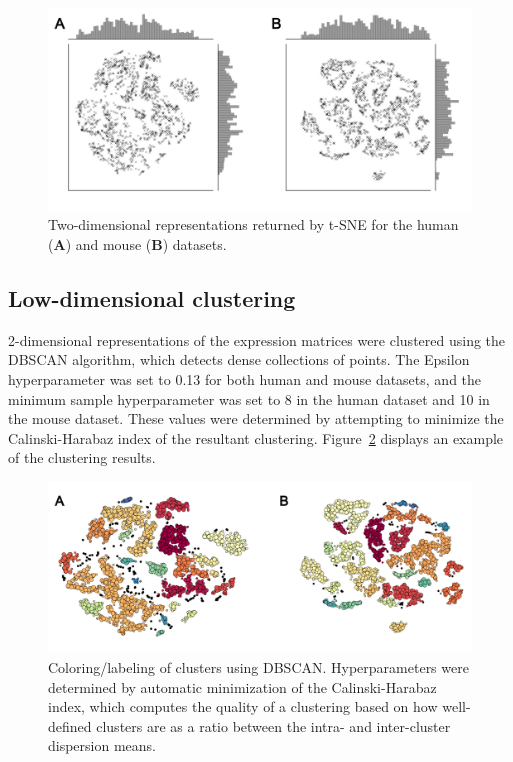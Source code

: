 \documentclass[12pt,oneside,onecolumn,a4paper]{article}
\begin{document}
\begin{figure}[H]
\begin{center}
\includegraphics[width=\columnwidth]{figures/raw_coords}
\caption{Two-dimensional representations returned by t-SNE for the human (\textbf{A}) and mouse (\textbf{B}) datasets. \label{fig:tsne_scatter}%
}
\end{center}
\end{figure}

\subsection{Low-dimensional clustering}

2-dimensional representations of the expression matrices were clustered using the DBSCAN algorithm, which detects dense collections of points. The Epsilon hyperparameter was set to 0.13 for both human and mouse datasets, and the minimum sample hyperparameter was set to 8 in the human dataset and 10 in the mouse dataset. These values were determined by attempting to minimize the Calinski-Harabaz index of the resultant clustering. Figure~\ref{fig:DBSCAN} displays an example of the clustering results.

\begin{figure}[H]
\begin{center}
\includegraphics[width=\columnwidth]{figures/dbscan}
\caption{Coloring/labeling of clusters using DBSCAN. Hyperparameters were determined by automatic minimization of the Calinski-Harabaz index, which computes the quality of a clustering based on how well-defined clusters are as a ratio between the intra- and inter-cluster dispersion means. \label{fig:DBSCAN}%
}
\end{center}
\end{figure}
\end{document}
